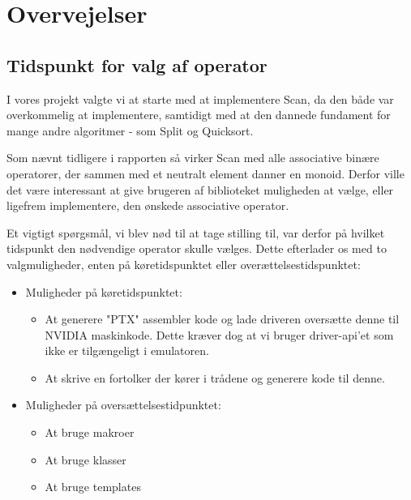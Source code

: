

\section{Overvejelser}

\subsection{Tidspunkt for valg af operator}

I vores projekt valgte vi at starte med at implementere Scan, da den både var overkommelig at implementere, samtidigt med at den dannede fundament for mange andre algoritmer - som Split og Quicksort.

Som nævnt tidligere i rapporten så virker Scan med alle associative binære operatorer, der sammen med et
neutralt element danner en monoid. 
Derfor ville det være interessant at give brugeren af biblioteket muligheden at vælge, eller ligefrem implementere, den ønskede associative operator.

Et vigtigt spørgsmål, vi blev nød til at tage stilling til, var derfor på hvilket tidspunkt den nødvendige operator skulle vælges. Dette efterlader os med to valgmuligheder, enten på køretidspunktet eller overættelsestidspunktet:

\begin{itemize}
\item Muligheder på køretidspunktet:
\begin{itemize}
\item At generere "PTX" assembler kode og lade driveren oversætte denne til NVIDIA maskinkode. Dette kræver dog at vi bruger driver-api'et som ikke er tilgængeligt i emulatoren.
\item At skrive en fortolker der kører i trådene og generere kode til denne.
\end{itemize}

\item Muligheder på oversættelsestidpunktet:
\begin{itemize}
\item At bruge makroer
\item At bruge klasser
\item At bruge templates
\end{itemize}
\end{itemize}

